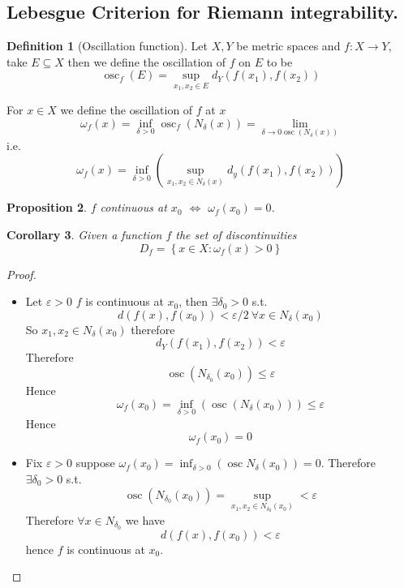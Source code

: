\documentclass[11pt,a4paper]{article}
\theoremstyle{definition}
\newtheorem{definition}{Definition}[section]
\theoremstyle{plain}
\newtheorem{proposition}[definition]{Proposition}
\newtheorem{corollary}[definition]{Corollary}
\theoremstyle{remark}
\renewcommand{\set}[1]{\left\{ #1 \right\}}
\begin{document}
\subsection{Lebesgue Criterion for Riemann integrability.} 
\begin{definition}[Oscillation function]
    Let $X, Y$ be metric spaces and $f \colon X \to Y$, take $E \subseteq X$ then we define the oscillation of $f$ on $E$ to be 
    $$\operatorname{osc}_f (E) = \sup_{x_1, x_2 \in E} d_Y(f(x_1), f(x_2))$$    

    For $x \in X$ we define the oscillation of $f$ at $x$ 
    $$\omega_f (x) =  \inf_{\delta > 0} \operatorname{osc}_f (N_\delta (x)) = \lim_{\delta \to 0 \operatorname{osc} (N_\delta(x))}$$
    i.e. 
    $$\omega_f (x) = \inf_{\delta > 0} \left(\sup_{x_1, x_2 \in N_\delta(x)} d_y(f(x_1), f(x_2))\right)$$
\end{definition}

\begin{proposition}
    $f$ continuous at $x_0$ $\iff$ $\omega_f(x_0) = 0$.
\end{proposition}

\begin{corollary}
    Given a function $f$ the set of discontinuities 
    $$D_f = \set{x \in X \colon \omega_f (x) > 0}$$
\end{corollary}

\begin{proof}
    \begin{itemize}
        \item[$\implies$] Let $\varepsilon > 0$ $f$ is continuous at $x_0$, then $\exists \delta_0 > 0$ s.t. 
        $$d(f(x), f(x_0)) < \varepsilon/2 \ \forall x \in N_\delta(x_0)$$
        So $x_1, x_2 \in N_\delta(x_0)$ therefore 
        $$d_Y(f(x_1), f(x_2)) < \varepsilon$$
        Therefore 
        $$\operatorname{osc}(N_{\delta_0} (x_0)) \le \varepsilon$$
        Hence 
        $$\omega_f (x_0) = \inf_{\delta > 0} (\operatorname{osc} (N_{\delta} (x_0))) \le \varepsilon$$
        Hence 
        $$\omega_f(x_0) = 0$$

        \item[$\impliedby$] Fix $\varepsilon > 0$ suppose $\omega_f (x_0) = \inf_{\delta > 0} (\operatorname{osc} N_\delta(x_0)) = 0$. 
        Therefore $\exists \delta_0 > 0$ s.t. 
        $$\operatorname{osc} (N_{\delta_0} (x_0)) = \sup_{x_1, x_2 \in N_{\delta_0} (x_0)} < \varepsilon$$
        Therefore $\forall x \in N_{\delta_0}$ we have 
        $$d(f(x), f(x_0)) < \varepsilon$$
        hence $f$ is continuous at $x_0$.  
    \end{itemize}
\end{proof}
\end{document}

